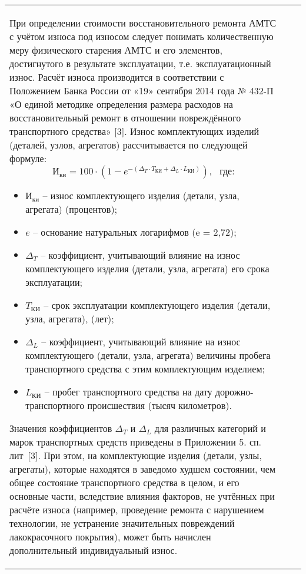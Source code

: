 \begin{longtable}{G{3mm}|M{90mm}|G{60mm}}
\par При определении стоимости восстановительного ремонта АМТС с учётом износа под износом следует понимать количественную меру физического старения АМТС и его элементов, достигнутого в результате эксплуатации, т.е. эксплуатационный износ.
%
Расчёт износа производится в  соответствии с Положением Банка России от «19» сентября 2014 года № 432-П «О единой методике определения размера расходов на восстановительный ремонт в отношении повреждённого транспортного средства» [3].
Износ комплектующих изделий (деталей, узлов, агрегатов) рассчитывается по следующей формуле:
%
%
%
\begin{equation}\label{eq:I}
\text{И}_{\text{ки}} 
= 100\cdot\left( 1-e^ {-\left( \Delta_{T} \cdot T_{\text{КИ}} + \Delta_{L} \cdot L_{\text{КИ}} \right)}\right), \,\,\,\,\text{где:}   
\end{equation}
%
\begin{itemize}
	\item[ ]$ \text{И}_{\text{ки}} $ -- износ комплектующего изделия (детали, узла, агрегата) (процентов); 
	\item[ ]$ e $ -- основание натуральных логарифмов (e =  2,72);
	\item[ ]$ \Delta_{T}$ --  коэффициент, учитывающий влияние на износ комплектующего 	изделия (детали, узла, агрегата) его срока эксплуатации;
	\item[ ]$ T_{\text{КИ}} $ -- срок эксплуатации комплектующего изделия (детали, узла, агрегата), (лет);
	\item[ ]$ \Delta_{L} $ -- коэффициент, учитывающий влияние на износ комплектующего (детали, узла, агрегата) величины пробега транспортного средства с этим комплектующим изделием;
	\item[ ]$ L_{\text{КИ}} $ -- пробег транспортного средства на дату дорожно-транспортного происшествия (тысяч километров).  
\end{itemize}
\vspace{5mm}
\par Значения коэффициентов $ \Delta_{T}$  и $ \Delta_{L} $  для различных категорий и марок транспортных средств приведены в Приложении 5. сп. лит~[3]. При этом, на комплектующие изделия (детали, узлы, агрегаты), которые находятся в заведомо худшем состоянии, чем общее состояние транспортного средства в целом, и его основные части, вследствие влияния факторов, не учтённых при расчёте износа (например, проведение ремонта с нарушением технологии, не устранение значительных повреждений лакокрасочного покрытия), может быть начислен дополнительный индивидуальный износ. 

\end{longtable}
